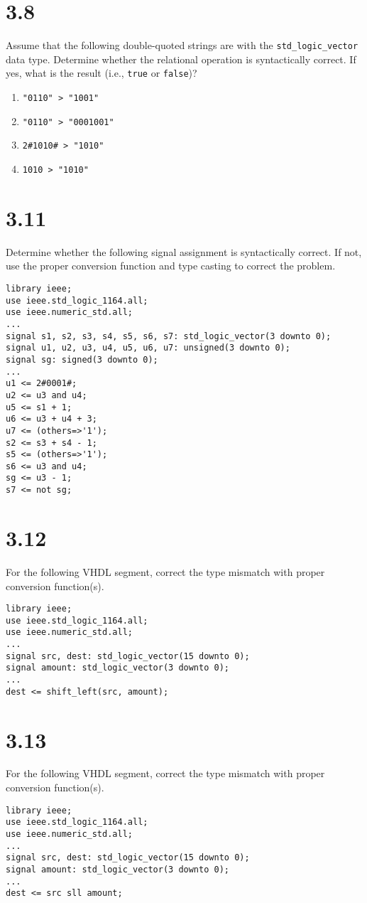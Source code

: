 \documentclass[dvipsnames, svgnames, x11names, a4paper,12pt]{article}
\begin{document}
\section{3.8}    
 Assume that the following double-quoted strings are with the \texttt{std\_logic\_vector}
data type. Determine whether the relational operation is syntactically correct. If yes, what
is the result (i.e., \texttt{true} or \texttt{false})?

\begin{enumerate}[label=(\alph*)]
    \item \texttt{"0110" > "1001"}
    \item \texttt{"0110" > "0001001"}
    \item \texttt{2\#1010\# > "1010"}
    \item \texttt{1010 > "1010"}
\end{enumerate}

\section{3.11}    
Determine whether the following signal assignment is syntactically correct. If not,
use the proper conversion function and type casting to correct the problem.
\begin{lstlisting}
library ieee;
use ieee.std_logic_1164.all;
use ieee.numeric_std.all;
...
signal s1, s2, s3, s4, s5, s6, s7: std_logic_vector(3 downto 0);
signal u1, u2, u3, u4, u5, u6, u7: unsigned(3 downto 0);
signal sg: signed(3 downto 0);
...
u1 <= 2#0001#;
u2 <= u3 and u4;
u5 <= s1 + 1;
u6 <= u3 + u4 + 3;
u7 <= (others=>'1');
s2 <= s3 + s4 - 1;
s5 <= (others=>'1');
s6 <= u3 and u4;
sg <= u3 - 1;
s7 <= not sg;

\end{lstlisting}

\section{3.12} 
For the following VHDL segment, correct the type mismatch with proper conversion
function(s).

\begin{lstlisting}
library ieee;
use ieee.std_logic_1164.all;
use ieee.numeric_std.all;
...
signal src, dest: std_logic_vector(15 downto 0);
signal amount: std_logic_vector(3 downto 0);
...
dest <= shift_left(src, amount);

\end{lstlisting}

\section{3.13}    
For the following VHDL segment, correct the type mismatch with proper conversion
function(s).
\begin{lstlisting}
library ieee;
use ieee.std_logic_1164.all;
use ieee.numeric_std.all;
...
signal src, dest: std_logic_vector(15 downto 0);
signal amount: std_logic_vector(3 downto 0);
...
dest <= src sll amount;   
\end{lstlisting}
\end{document}
